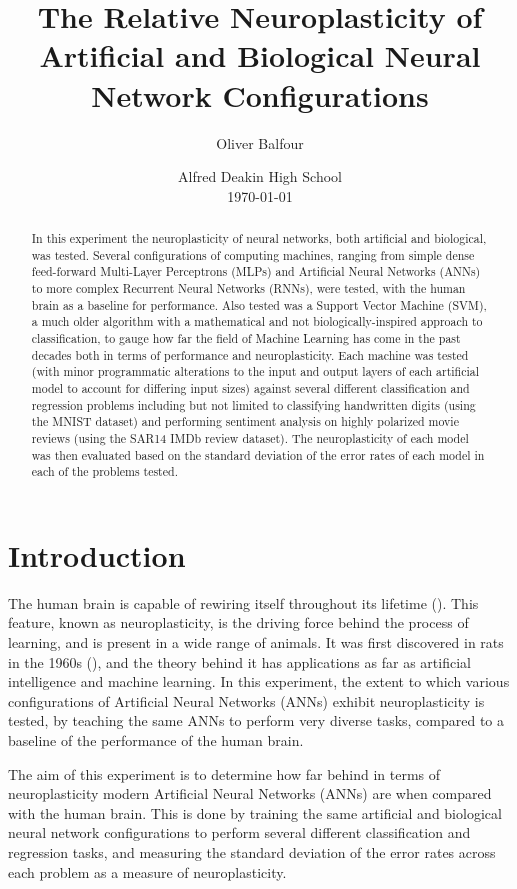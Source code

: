 \documentclass[]{report}
\title{
	The Relative Neuroplasticity of Artificial
	\linebreak
	and Biological Neural Network Configurations
}
\author{Oliver Balfour}
\date{%
	Alfred Deakin High School\\[2ex]%
	\today
}
\begin{document}
\maketitle

\begin{abstract}
	In this experiment the neuroplasticity of neural networks, both artificial and biological, was tested. Several configurations of computing machines, ranging from simple dense feed-forward Multi-Layer Perceptrons (MLPs) and Artificial Neural Networks (ANNs) to more complex Recurrent Neural Networks (RNNs), were tested, with the human brain as a baseline for performance. Also tested was a Support Vector Machine (SVM), a much older algorithm with a mathematical and not biologically-inspired approach to classification, to gauge how far the field of Machine Learning has come in the past decades both in terms of performance and neuroplasticity. Each machine was tested (with minor programmatic alterations to the input and output layers of each artificial model to account for differing input sizes) against several different classification and regression problems including but not limited to classifying handwritten digits (using the MNIST dataset) and performing sentiment analysis on highly polarized movie reviews (using the SAR14 IMDb review dataset). The neuroplasticity of each model was then evaluated based on the standard deviation of the error rates of each model in each of the problems tested.
\end{abstract}

\tableofcontents
\newpage

\section{Introduction}

The human brain is capable of rewiring itself throughout its lifetime (\cite{draganski2004neuroplasticity}). This feature, known as neuroplasticity, is the driving force behind the process of learning, and is present in a wide range of animals. It was first discovered in rats in the 1960s (\cite{bennett1964chemical}), and the theory behind it has applications as far as artificial intelligence and machine learning. In this experiment, the extent to which various configurations of Artificial Neural Networks (ANNs) exhibit neuroplasticity is tested, by teaching the same ANNs to perform very diverse tasks, compared to a baseline of the performance of the human brain.

The aim of this experiment is to determine how far behind in terms of neuroplasticity modern Artificial Neural Networks (ANNs) are when compared with the human brain. This is done by training the same artificial and biological neural network configurations to perform several different classification and regression tasks, and measuring the standard deviation of the error rates across each problem as a measure of neuroplasticity.
\end{document}
